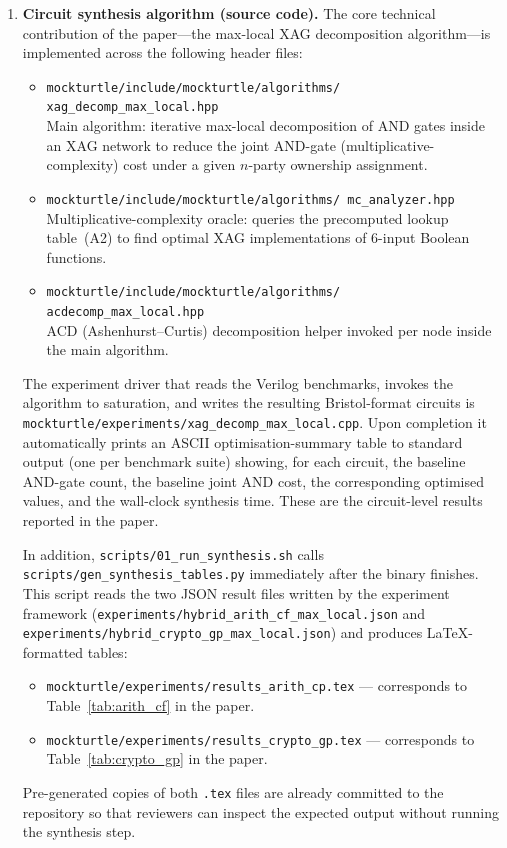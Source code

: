 \begin{enumerate}[leftmargin=*, label=\textbf{A\arabic*.}, itemsep=2pt]

\item \textbf{Circuit synthesis algorithm (source code).}
  The core technical contribution of the paper—the max-local XAG
  decomposition algorithm—is implemented across the following header files:
  \begin{itemize}[nosep]
    \item \texttt{mockturtle/include/mockturtle/algorithms/%
           xag\_decomp\_max\_local.hpp} \\
      Main algorithm: iterative max-local decomposition of AND gates inside
      an XAG network to reduce the joint AND-gate (multiplicative-complexity)
      cost under a given $n$-party ownership assignment.
    \item \texttt{mockturtle/include/mockturtle/algorithms/%
           mc\_analyzer.hpp} \\
      Multiplicative-complexity oracle: queries the precomputed lookup
      table~(A2) to find optimal XAG implementations of 6-input Boolean
      functions.
    \item \texttt{mockturtle/include/mockturtle/algorithms/%
           acdecomp\_max\_local.hpp} \\
      ACD (Ashenhurst--Curtis) decomposition helper invoked per node
      inside the main algorithm.
  \end{itemize}
  The experiment driver that reads the Verilog benchmarks, invokes the
  algorithm to saturation, and writes the resulting Bristol-format circuits
  is \texttt{mockturtle/experiments/xag\_decomp\_max\_local.cpp}.
  Upon completion it automatically prints an ASCII optimisation-summary
  table to standard output (one per benchmark suite) showing, for each
  circuit, the baseline AND-gate count, the baseline joint AND cost, the
  corresponding optimised values, and the wall-clock synthesis time.
  These are the circuit-level results reported in the paper.

  In addition, \texttt{scripts/01\_run\_synthesis.sh} calls
  \texttt{scripts/gen\_synthesis\_tables.py} immediately after the binary
  finishes.  This script reads the two JSON result files written by the
  experiment framework
  (\texttt{experiments/hybrid\_arith\_cf\_max\_local.json} and
  \texttt{experiments/hybrid\_crypto\_gp\_max\_local.json}) and produces
  \LaTeX{}-formatted tables:
  \begin{itemize}[nosep]
    \item \texttt{mockturtle/experiments/results\_arith\_cp.tex} —
      corresponds to Table~\ref{tab:arith_cf} in the paper.
    \item \texttt{mockturtle/experiments/results\_crypto\_gp.tex} —
      corresponds to Table~\ref{tab:crypto_gp} in the paper.
  \end{itemize}
  Pre-generated copies of both \texttt{.tex} files are already committed to
  the repository so that reviewers can inspect the expected output without
  running the synthesis step.


\end{enumerate}
